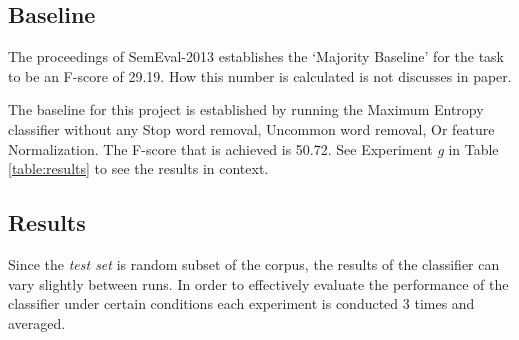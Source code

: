\documentclass[final,3p,12pt]{elsarticle}
\begin{document}
\subsection{Baseline}

The proceedings of SemEval-2013 establishes the `Majority Baseline' for the
task to be an F-score of 29.19. How this number is calculated is not discusses
in paper.

The baseline for this project is established by running the Maximum Entropy
classifier without any Stop word removal, Uncommon word removal, Or feature
Normalization. The F-score that is achieved is 50.72. See Experiment \textit{g}
in Table \ref{table:results} to see the results in context.

\subsection{Results}

Since the \textit{test set} is random subset of the corpus, the results of the
classifier can vary slightly between runs. In order to effectively evaluate the
performance of the classifier under certain conditions each experiment is
conducted 3 times and averaged.
\end{document}
